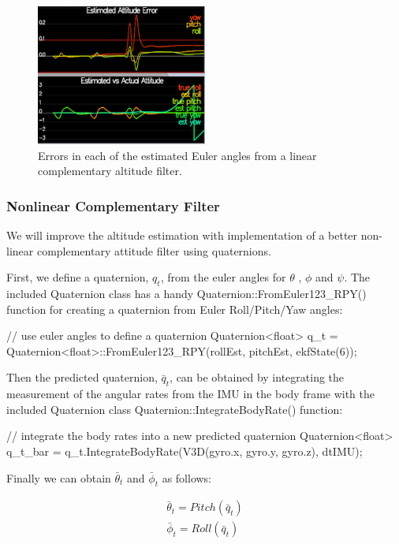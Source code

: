 \documentclass[letterpaper]{article}
\begin{document}
\begin{figure}[ht]
\centering
\includegraphics[width=0.5\textwidth]{./images/scenario7_1.png}
\caption{\label{fig:linear_comp_filter} Errors in each of the estimated Euler angles from a linear complementary altitude filter.}
\end{figure}

\subsubsection{Nonlinear Complementary Filter}

We will improve the altitude estimation with implementation of a better non-linear complementary attitude filter using quaternions.

First, we define a quaternion, $q_t$, from the euler angles for $\theta$ , $\phi$ and $\psi$.  The included Quaternion class has a handy Quaternion::FromEuler123\_RPY() function for creating a quaternion from Euler Roll/Pitch/Yaw angles:

\begin{CPP}
// use euler angles to define a quaternion
Quaternion<float> q_t = Quaternion<float>::FromEuler123_RPY(rollEst, pitchEst, ekfState(6));
\end{CPP}

Then the predicted quaternion, $\bar{q}_t$, can be obtained by integrating the measurement of the angular rates from the IMU in the body frame with the included Quaternion class Quaternion::IntegrateBodyRate() function:

\begin{CPP}
// integrate the body rates into a new predicted quaternion
Quaternion<float>  q_t_bar = q_t.IntegrateBodyRate(V3D(gyro.x, gyro.y, gyro.z), dtIMU);
\end{CPP}

Finally we can obtain $\bar{\theta}_t$ and $\bar{\phi}_t$ as follows:

\begin{align*}
  \bar{\theta}_t = Pitch(\bar{q}_t)\\
  \bar{\phi}_t = Roll(\bar{q}_t)
\end{align*}
\end{document}
